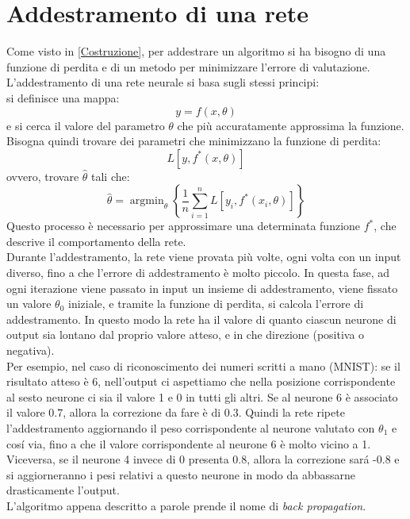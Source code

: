 \documentclass[a4paper,12pt]{report}
\DeclareMathOperator*{\argmin}{argmin}
\begin{document}
\section{Addestramento di una rete}
Come visto in \ref{Costruzione}, per addestrare un algoritmo si ha bisogno di una funzione di perdita e di un metodo per minimizzare l'errore di valutazione.\\
L'addestramento di una rete neurale si basa sugli stessi principi:\\
si definisce una mappa: $$y=f(x,\theta)$$ e si cerca il valore del parametro $\theta$ che pi\`{u} accuratamente approssima la funzione.
Bisogna quindi trovare dei parametri che minimizzano la funzione di perdita:
$$L[y,f^*(x,\theta)]$$
ovvero, trovare $\hat{\theta}$ tali che:
$$\hat{\theta}=\argmin_{\theta} \left\{ \frac{1}{n} \sum_{i=1}^{n} L[y_i,f^*(x_i,\theta)] \right\}$$
Questo processo \`e necessario per approssimare una determinata funzione $f^*$, che descrive il comportamento della rete.\\
Durante l'addestramento, la rete viene provata pi\`{u} volte, ogni volta con un input diverso, fino a che l'errore di addestramento \`e molto piccolo. In questa fase, ad ogni iterazione viene passato in input un insieme di addestramento, viene fissato un valore $\theta_{0}$ iniziale, e tramite la funzione di perdita, si calcola l'errore di addestramento. In questo modo la rete ha il valore di quanto ciascun neurone di output sia lontano dal proprio valore atteso, e in che direzione (positiva o negativa).\\
Per esempio, nel caso di riconoscimento dei numeri scritti a mano (MNIST):
se il risultato atteso \`e 6, nell'output ci aspettiamo che nella posizione corrispondente al sesto neurone ci sia il valore 1 e 0 in tutti gli altri. Se al neurone 6 \`e associato il valore $0.7$, allora la correzione da fare \`e di 0.3. Quindi la rete ripete l'addestramento aggiornando il peso corrispondente al neurone valutato con $\theta_{1}$ e cos\'{i} via, fino a che il valore corrispondente al neurone 6 \`e molto vicino a 1. Viceversa, se il neurone 4 invece di 0 presenta 0.8, allora la correzione sar\'{a} -0.8 e si aggiorneranno i pesi relativi a questo neurone in modo da abbassarne drasticamente l'output.\\
L'algoritmo appena descritto a parole prende il nome di \textit{back propagation}.
\newpage
\end{document}
